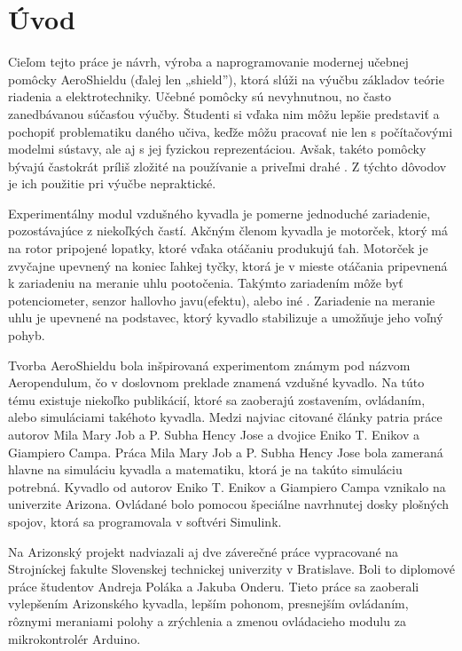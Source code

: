 \chapter*{Úvod}
\label{UVOD}

Cieľom tejto práce je návrh, výroba a naprogramovanie modernej učebnej pomôcky AeroShieldu (ďalej len „shield”), ktorá slúži na výučbu základov teórie riadenia a elektrotechniky. Učebné pomôcky sú nevyhnutnou, no často zanedbávanou súčasťou výučby. Študenti si vďaka nim môžu lepšie predstaviť a pochopiť problematiku daného učiva, keďže môžu pracovať nie len s počítačovými modelmi sústavy, ale aj s jej fyzickou reprezentáciou. Avšak, takéto pomôcky bývajú častokrát príliš zložité na používanie a priveľmi drahé \cite{Hor}. Z týchto dôvodov je ich použitie pri výučbe nepraktické.
 
Experimentálny modul vzdušného kyvadla je pomerne jednoduché zariadenie, pozostávajúce z niekoľkých častí. Akčným členom kyvadla je motorček, ktorý má na rotor pripojené lopatky, ktoré vďaka otáčaniu produkujú ťah. Motorček je zvyčajne upevnený na koniec ľahkej tyčky, ktorá je v mieste otáčania pripevnená k zariadeniu na meranie uhlu pootočenia. Takýmto zariadením môže byť potenciometer, senzor hallovho javu(efektu), alebo iné \cite{senzor}. Zariadenie na meranie uhlu je upevnené na podstavec, ktorý kyvadlo stabilizuje a umožňuje jeho voľný pohyb. 
 
Tvorba AeroShieldu bola inšpirovaná experimentom známym pod názvom Aeropendulum, čo v doslovnom preklade znamená vzdušné kyvadlo. Na túto tému existuje niekoľko publikácií, ktoré sa zaoberajú zostavením, ovládaním, alebo simuláciami takéhoto kyvadla. Medzi najviac citované články patria práce autorov Mila Mary Job a P. Subha Hency Jose\cite{7192959} a dvojice Eniko T. Enikov a Giampiero Campa\cite{enikov_campa_2012}. Práca Mila Mary Job a P. Subha Hency Jose bola zameraná hlavne na simuláciu kyvadla a matematiku, ktorá je na takúto simuláciu potrebná. Kyvadlo od autorov Eniko T. Enikov a Giampiero Campa vznikalo na univerzite Arizona. Ovládané bolo pomocou špeciálne navrhnutej dosky plošných spojov, ktorá sa programovala v softvéri Simulink. 

Na Arizonský projekt nadviazali aj dve záverečné práce vypracované na Strojníckej fakulte Slovenskej technickej univerzity v Bratislave. Boli to diplomové práce študentov Andreja Poláka\cite{Polak} a Jakuba Onderu\cite{Ondera}. Tieto práce sa zaoberali vylepšením Arizonského kyvadla, lepším pohonom, presnejším ovládaním, rôznymi meraniami polohy a zrýchlenia a zmenou ovládacieho modulu za mikrokontrolér Arduino.

